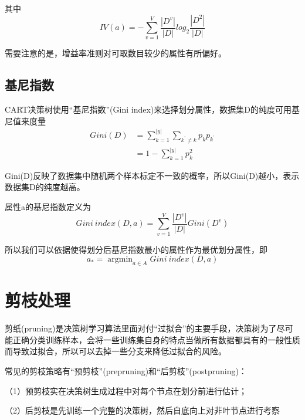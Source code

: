 \documentclass[UTF8]{article}
\begin{document}
其中
\begin{equation}
  IV(a) = -\sum_{v=1}^{V}\frac{|D^v|}{|D|} log_2 \frac{|D^2|}{|D|}
\end{equation}

需要注意的是，增益率准则对可取数目较少的属性有所偏好。
\subsection{基尼指数}
CART决策树使用“基尼指数”(Gini index)来选择划分属性，数据集D的纯度可用基尼值来度量
\begin{equation}
  \begin{split}
  Gini(D) &= \sum_{k=1}^{|y|} \sum_{k^{\prime} \neq k} p_k p_{k^{\prime}}\\
  &= 1 - \sum_{k=1}^{|y|} p_{k}^{2}
  \end{split}
\end{equation}

Gini(D)反映了数据集中随机两个样本标定不一致的概率，所以Gini(D)越小，表示数据集D的纯度越高。

属性a的基尼指数定义为
\begin{equation}
  Gini\ index(D, a) = \sum_{v=1}^V \frac{|D^v|}{|D|} Gini(D^v)
\end{equation}

所以我们可以依据使得划分后基尼指数最小的属性作为最优划分属性，即
\begin{equation}
  a_{*} = \mathop{\arg\min}_{a \in A} Gini\ index(D, a)
\end{equation}

\section{剪枝处理}

剪纸(pruning)是决策树学习算法里面对付“过拟合”的主要手段，决策树为了尽可能正确分类训练样本，会将一些训练集自身的特点当做所有数据都具有的一般性质而导致过拟合，所以可以去掉一些分支来降低过拟合的风险。

常见的剪枝策略有“预剪枝”(prepruning)和“后剪枝”(postpruning)：

（1）预剪枝实在决策树生成过程中对每个节点在划分前进行估计；

（2）后剪枝是先训练一个完整的决策树，然后自底向上对非叶节点进行考察
\end{document}

